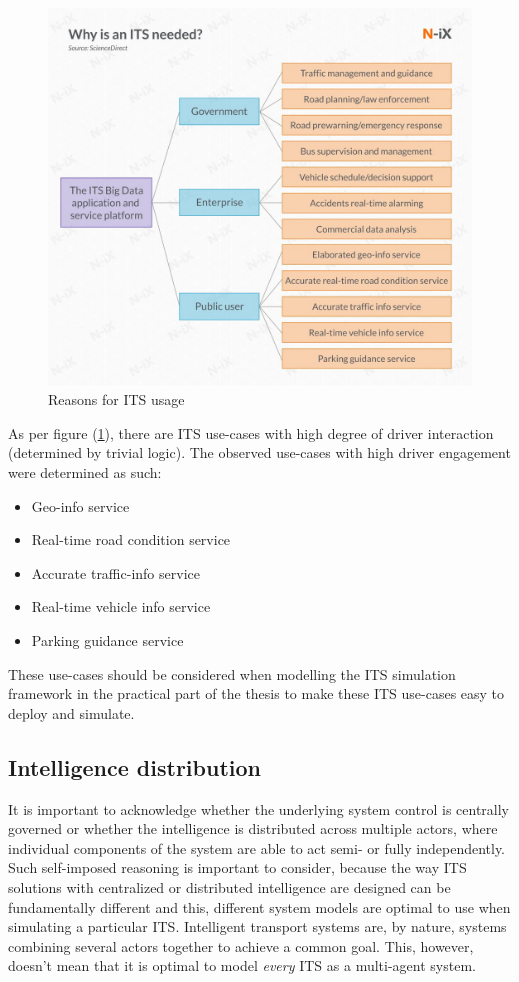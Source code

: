 \documentclass[main.tex]{subfiles}
\begin{document}
\begin{figure}[htbp]
    \centering
    \includegraphics[width=.8\textwidth]{why is ITS needed.jpg}
    \caption{Reasons for ITS usage \cite{Lishchenko2021}}
    \label{whyITS}
\end{figure}

As per figure (\ref{whyITS}), there are ITS use-cases with high degree of driver interaction (determined 
by trivial logic). The observed use-cases with high driver engagement were determined as such:

\begin{itemize}
    \item Geo-info service
    \item Real-time road condition service 
    \item Accurate traffic-info service 
    \item Real-time vehicle info service 
    \item Parking guidance service
\end{itemize}

These use-cases should be considered when modelling the ITS simulation framework in the practical part of the 
thesis to make these ITS use-cases easy to deploy and simulate.

\subsection{Intelligence distribution} \label{mas-compatibility}

It is important to acknowledge whether the underlying system control is centrally governed 
or whether the intelligence is distributed across multiple actors, where individual 
components of the system are able to act semi- or fully independently.
Such self-imposed reasoning is important to consider, because the way ITS solutions 
with centralized or distributed intelligence are designed can be fundamentally different 
and this, different system models are optimal to use when simulating a particular ITS. 
Intelligent transport systems are, by nature, systems combining several actors together to
achieve a common goal. This, however, doesn't mean that it is optimal to model \emph{every} ITS 
as a multi-agent system. 
\end{document}
